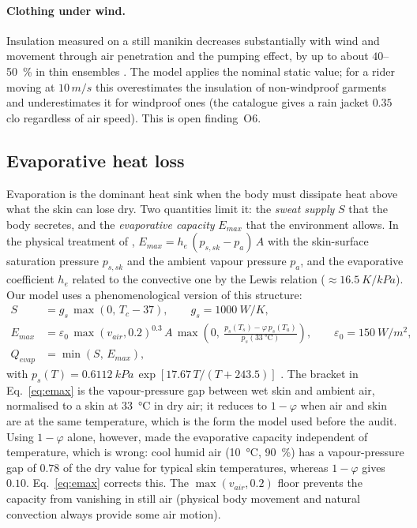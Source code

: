 \documentclass[11pt,a4paper]{article}
\begin{document}
\paragraph{Clothing under wind.} Insulation measured on a still manikin decreases substantially with wind and movement through air penetration and the pumping effect, by up to about \(40\)--\SI{50}{\percent} in thin ensembles \citep{havenith1990}. The model applies the nominal static value; for a rider moving at \(10\,\si{m/s}\) this overestimates the insulation of non-windproof garments and underestimates it for windproof ones (the catalogue gives a rain jacket \(0.35\) clo regardless of air speed). This is open finding~O6.

\subsection{Evaporative heat loss}
\label{sec:evap}
Evaporation is the dominant heat sink when the body must dissipate heat above what the skin can lose dry. Two quantities limit it: the \emph{sweat supply} \(S\) that the body secretes, and the \emph{evaporative capacity} \(E_{max}\) that the environment allows. In the physical treatment of \citet{gagge1977}, \(E_{max}=h_e\,(p_{s,sk}-p_a)\,A\) with the skin-surface saturation pressure \(p_{s,sk}\) and the ambient vapour pressure \(p_a\), and the evaporative coefficient \(h_e\) related to the convective one by the Lewis relation (\(\approx\SI{16.5}{K/kPa}\)). Our model uses a phenomenological version of this structure:
\begin{align}
 S &= g_s\,\max(0,\,T_c-37),\qquad g_s=\SI{1000}{W/K}, \label{eq:sweat}\\
 E_{max} &= \varepsilon_0\,\max(v_{air},0.2)^{0.3}\,A\,\max\!\left(0,\ \frac{p_{s}(T_s)-\varphi\,p_{s}(T_a)}{p_{s}(\SI{33}{\degreeCelsius})}\right),\qquad \varepsilon_0=\SI{150}{W/m^2},\label{eq:emax}\\
 Q_{evap} &= \min(S,\,E_{max}), \label{eq:qevap}
\end{align}
with \(p_s(T)=\SI{0.6112}{kPa}\,\exp[17.67\,T/(T+243.5)]\) \citep{bolton1980}. The bracket in Eq.~\eqref{eq:emax} is the vapour-pressure gap between wet skin and ambient air, normalised to a skin at \SI{33}{\degreeCelsius} in dry air; it reduces to \(1-\varphi\) when air and skin are at the same temperature, which is the form the model used before the audit. Using \(1-\varphi\) alone, however, made the evaporative capacity independent of temperature, which is wrong: cool humid air (\SI{10}{\degreeCelsius}, \SI{90}{\percent}) has a vapour-pressure gap of \(0.78\) of the dry value for typical skin temperatures, whereas \(1-\varphi\) gives \(0.10\). Eq.~\eqref{eq:emax} corrects this. The \(\max(v_{air},0.2)\) floor prevents the capacity from vanishing in still air (physical body movement and natural convection always provide some air motion).
\end{document}
